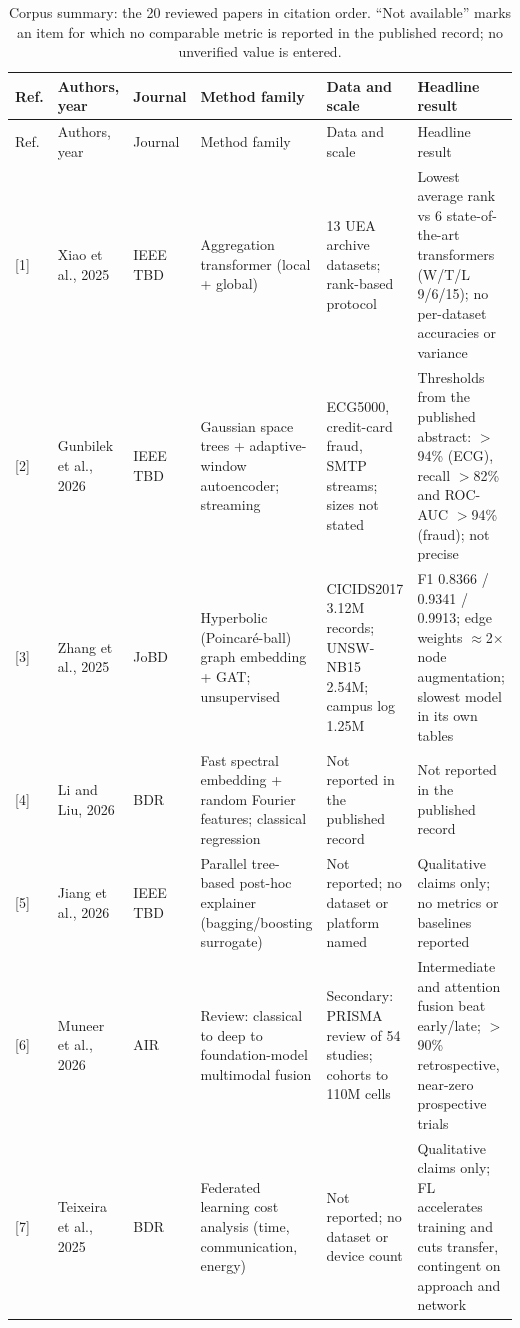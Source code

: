 \documentclass[pdflatex,sn-basic,Numbered]{sn-jnl}%
\begin{document}
{\footnotesize
\begin{xltabular}{\textwidth}{@{}p{0.8cm} p{2.0cm} p{1.0cm} p{2.2cm} p{2.2cm} p{1.9cm}@{}}
\caption{Corpus summary: the 20 reviewed papers in citation order. ``Not available'' marks an item for which no comparable metric is reported in the published record; no unverified value is entered.}\label{tab1}\\
\toprule
Ref. & Authors, year & Journal & Method family & Data and scale & Headline result \\
\midrule
\endfirsthead
\toprule
Ref. & Authors, year & Journal & Method family & Data and scale & Headline result \\
\midrule
\endhead
\botrule
\endlastfoot
{[1]} & Xiao et al., 2025 & IEEE TBD & Aggregation transformer (local + global) & 13 UEA archive datasets; rank-based protocol & Lowest average rank vs 6 state-of-the-art transformers (W/T/L 9/6/15); no per-dataset accuracies or variance \\
{[2]} & Gunbilek et al., 2026 & IEEE TBD & Gaussian space trees + adaptive-window autoencoder; streaming & ECG5000, credit-card fraud, SMTP streams; sizes not stated & Thresholds from the published abstract: $>$94\% (ECG), recall $>$82\% and ROC-AUC $>$94\% (fraud); not precise \\
{[3]} & Zhang et al., 2025 & JoBD & Hyperbolic (Poincar\'e-ball) graph embedding + GAT; unsupervised & CICIDS2017 3.12M records; UNSW-NB15 2.54M; campus log 1.25M & F1 0.8366 / 0.9341 / 0.9913; edge weights $\approx$2$\times$ node augmentation; slowest model in its own tables \\
{[4]} & Li and Liu, 2026 & BDR & Fast spectral embedding + random Fourier features; classical regression & Not reported in the published record & Not reported in the published record \\
{[5]} & Jiang et al., 2026 & IEEE TBD & Parallel tree-based post-hoc explainer (bagging/boosting surrogate) & Not reported; no dataset or platform named & Qualitative claims only; no metrics or baselines reported \\
{[6]} & Muneer et al., 2026 & AIR & Review: classical to deep to foundation-model multimodal fusion & Secondary: PRISMA review of 54 studies; cohorts to 110M cells & Intermediate and attention fusion beat early/late; $>$90\% retrospective, near-zero prospective trials \\
{[7]} & Teixeira et al., 2025 & BDR & Federated learning cost analysis (time, communication, energy) & Not reported; no dataset or device count & Qualitative claims only; FL accelerates training and cuts transfer, contingent on approach and network \\

\end{xltabular}}
\end{document}
